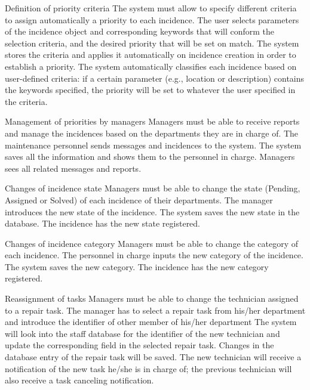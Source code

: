\begin{requirement}{Definition of priority criteria}
\reqdesc The system must allow to specify different criteria to assign automatically a priority to each incidence.
\reqin The user selects parameters of the incidence object and corresponding keywords that will conform the selection criteria, and the desired priority that will be set on match.
\reqsteps The system stores the criteria and applies it automatically on incidence creation in order to establish a priority.
\reqout The system automatically classifies each incidence based on user-defined criteria: if a certain parameter (e.g., location or description) contains the keywords specified, the priority will be set to whatever the user specified in the criteria.
\end{requirement}

\begin{requirement}{Management of priorities by managers}
\reqdesc Managers must be able to receive reports and manage the incidences based on the departments they are in charge of.
\reqin The maintenance personnel sends messages and incidences to the system.
\reqsteps The system saves all the information and shows them to the personnel in charge.
\reqout Managers sees all related messages and reports.
\end{requirement}

\begin{requirement}{Changes of incidence state}
\reqdesc Managers must be able to change the state (Pending, Assigned or Solved) of each incidence of their departments.
\reqin The manager introduces the new state of the incidence.
\reqsteps The system saves the new state in the database.
\reqout The incidence has the new state registered.
\end{requirement}

\begin{requirement}{Changes of incidence category}
\reqdesc Managers must be able to change the category of each incidence.
\reqin The personnel in charge inputs the new category of the incidence.
\reqsteps The system saves the new category.
\reqout The incidence has the new category registered.
\end{requirement}

\begin{requirement}{Reassignment of tasks}
\reqdesc Managers must be able to change the technician assigned to a repair task.
\reqin The manager has to select a repair task from his/her department and introduce the identifier of other member of his/her department
\reqsteps The system will look into the staff database for the identifier of the new technician and update the corresponding field in the selected repair task.
\reqout Changes in the database entry of the repair task will be saved. The new technician will receive a notification of the new task he/she is in charge of; the previous technician will also receive a task canceling notification.
\end{requirement}

